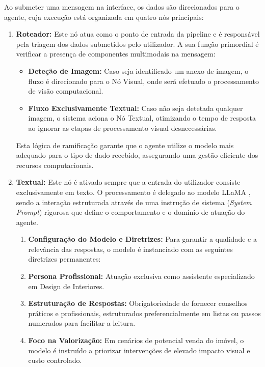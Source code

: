 \documentclass[a4paper,12pt]{scrreprt}
\begin{document}
        Ao submeter uma mensagem na interface, os dados são direcionados para o agente, cuja execução está organizada em quatro nós principais:
        \begin{enumerate}
            \item \textbf{Roteador:} Este nó atua como o ponto de entrada da pipeline e é responsável pela triagem dos dados submetidos pelo utilizador. A sua função primordial é verificar a presença de componentes multimodais na mensagem:
            \begin{itemize}
                \item \textbf{Deteção de Imagem:} Caso seja identificado um anexo de imagem, o fluxo é direcionado para o Nó Visual, onde será efetuado o processamento de visão computacional.
                \item \textbf{Fluxo Exclusivamente Textual:} Caso não seja detetada qualquer imagem, o sistema aciona o Nó Textual, otimizando o tempo de resposta ao ignorar as etapas de processamento visual desnecessárias.
            \end{itemize}
            Esta lógica de ramificação garante que o agente utilize o modelo mais adequado para o tipo de dado recebido, assegurando uma gestão eficiente dos recursos computacionais.
            \item \textbf{Textual:} Este nó é ativado sempre que a entrada do utilizador consiste exclusivamente em texto. O processamento é delegado ao modelo LLaMA \cite{llama}, sendo a interação estruturada através de uma instrução de sistema (\textit{System Prompt}) rigorosa que define o comportamento e o domínio de atuação do agente.
            \begin{enumerate}
                \item \textbf{Configuração do Modelo e Diretrizes:} Para garantir a qualidade e a relevância das respostas, o modelo é instanciado com as seguintes diretrizes permanentes:
                \item \textbf{Persona Profissional:} Atuação exclusiva como assistente especializado em Design de Interiores.
                \item \textbf{Estruturação de Respostas:} Obrigatoriedade de fornecer conselhos práticos e profissionais, estruturados preferencialmente em listas ou passos numerados para facilitar a leitura.
                \item \textbf{Foco na Valorização:} Em cenários de potencial venda do imóvel, o modelo é instruído a priorizar intervenções de elevado impacto visual e custo controlado.

\end{enumerate}
\end{enumerate}
\end{document}
